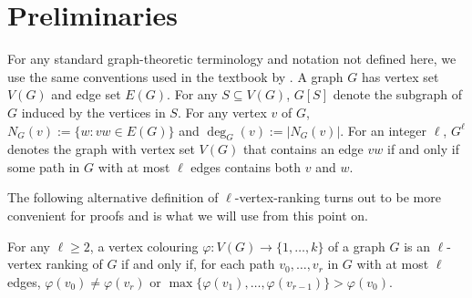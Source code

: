 \documentclass{patmorin}
\begin{document}





\section{Preliminaries}

For any standard graph-theoretic terminology and notation not defined here, we use the same conventions used in the textbook by \citet{diestel:graph}.  A graph $G$ has vertex set $V(G)$ and edge set $E(G)$.  For any $S\subseteq V(G)$, $G[S]$ denote the subgraph of $G$ induced by the vertices in $S$.  For any vertex $v$ of $G$, $N_G(v):=\{w:vw\in E(G)\}$ and $\deg_G(v):=|N_G(v)|$.  For an integer $\ell$, $G^\ell$ denotes the graph with vertex set $V(G)$ that contains an edge $vw$ if and only if some path in $G$ with at most $\ell$ edges contains both $v$ and $w$.

The following alternative definition of $\ell$-vertex-ranking turns out to be more convenient for proofs and is what we will use from this point on.
\begin{obs}\label{alternate_def}
  For any $\ell\ge 2$, a vertex colouring $\varphi:V(G)\to\{1,\ldots,k\}$ of a graph $G$ is an $\ell$-vertex ranking of $G$ if and only if, for each path $v_0,\ldots,v_r$ in $G$ with at most $\ell$ edges, $\varphi(v_0)\neq \varphi(v_r)$ or $\max\{\varphi(v_1),\ldots,\varphi(v_{r-1})\}>\varphi(v_0)$.
\end{obs}
\end{document}
